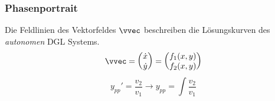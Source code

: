     \subsubsection{Phasenportrait}
        Die Feldlinien des Vektorfeldes $\vvec$ beschreiben die Lösungskurven des \textit{autonomen} DGL Systems.
        $$
            \vvec =
            \begin{pmatrix}
                \dot{x}\\ \dot{y}
            \end{pmatrix}
            =
            \begin{pmatrix}
                f_1(x,y)\\f_2(x,y)
            \end{pmatrix}
        $$
        \vspace{0.5em}
        $$
            y_{pp}' = \frac{v_2}{v_1} \rightarrow y_{pp} = \int \frac{v_2}{v_1}
        $$  
